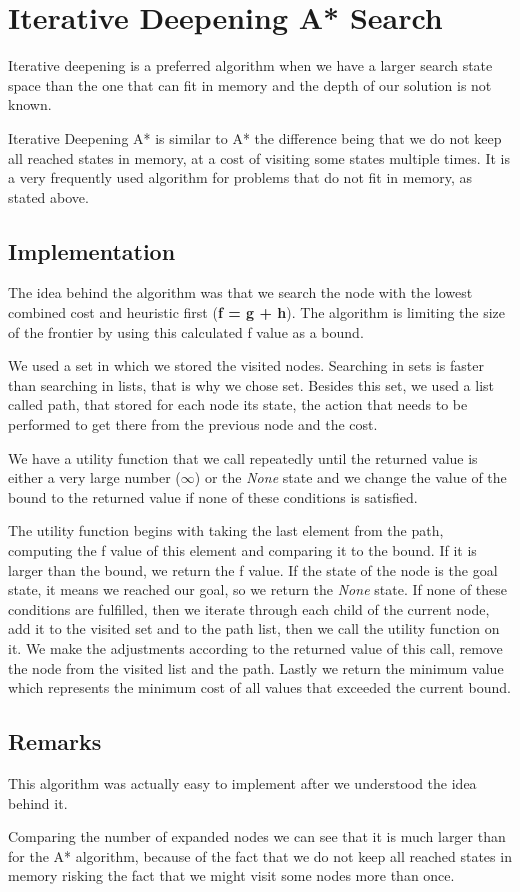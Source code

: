 \documentclass{report}
\begin{document}
\chapter{Iterative Deepening A* Search}

Iterative deepening is a preferred algorithm when we have a larger search state space than the one that can fit in memory and the depth of our solution is not known. 

Iterative Deepening A* is similar to A* the difference being that we do not keep all reached states in memory, at a cost of visiting some states multiple times. It is a very frequently used algorithm for problems that do not fit in memory, as stated above.

\section{Implementation}

The idea behind the algorithm was that we search the node with the lowest combined cost and heuristic first (\textbf{f = g + h}). The algorithm is limiting the size of the frontier by using this calculated f value as a bound.

We used a set in which we stored the visited nodes. Searching in sets is faster than searching in lists, that is why we chose set.
Besides this set, we used a list called path, that stored for each node its state, the action that needs to be performed to get there from the previous node and the cost.

We have a utility function that we call repeatedly until the returned value is either a very large number ($\infty$)  or  the \textit{None} state and we change the value of the bound to the returned value if none of these conditions is satisfied. 

The utility function begins with taking the last element from the path, computing the f value of this element and comparing it to the bound. If it is larger than the bound, we return the f value. If the state of the node is the goal state, it means we reached our goal, so we return the \textit{None} state. If none of these conditions are fulfilled, then we iterate through each child of the current node, add it to the visited set and to the path list, then we call the utility function on it. We make the adjustments according to the returned value of this call, remove the node from the visited list and the path. 
Lastly we return the minimum value which represents the minimum cost of all values that exceeded the current bound. 

\section{Remarks}

This algorithm was actually easy to implement after we understood the idea behind it. 

Comparing the number of expanded nodes we can see that it is much larger than for the A* algorithm, because of the fact that we do not keep all reached states in memory risking the fact that we might visit some nodes more than once. 
\end{document}
